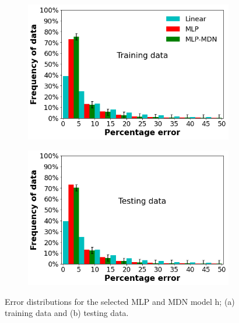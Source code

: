 \documentclass[a4paper,fleqn]{cas-sc}
\begin{document}
\begin{figure}[h!]
\centering
    \begin{subfigure}{0.48\textwidth}
    \includegraphics[width=\textwidth]{OVERALL_TRAIN}
    \caption{}
    \end{subfigure}
    \begin{subfigure}{0.48\textwidth}
    \includegraphics[width=\textwidth]{OVERALL_TEST}
    \caption{}
    \end{subfigure}
    \caption{Error distributions for the selected MLP and MDN model h; (a) training data and (b) testing data.}\label{fig_frequency_data}
\end{figure}
\end{document}
